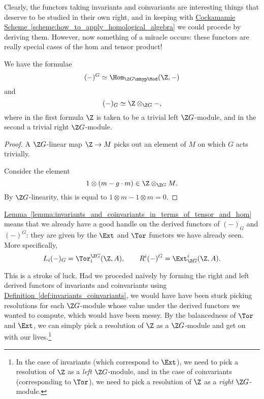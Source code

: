 \documentclass[main.tex]{subfiles}
\begin{document}
Clearly, the functors taking invariants and coinvariants are interesting things that deserve to be studied in their own right, and in keeping with \hyperref[scheme:how_to_apply_homological_algebra]{Cockamamie Scheme~\ref*{scheme:how_to_apply_homological_algebra}} we could procede by deriving them. However, now something of a miracle occurs: these functors are really special cases of the hom and tensor product!

\begin{lemma}
  \label{lemma:invariants_and_coinvariants_in_terms_of_tensor_and_hom}
  We have the formulae
  \begin{equation*}
    (-)^{G} \simeq \Hom_{\Z G\mhyp\Mod}(\Z, -)
  \end{equation*}
  and
  \begin{equation*}
    (-)_{G} \simeq \Z \otimes_{\Z G} -,
  \end{equation*}
  where in the first formula $\Z$ is taken to be a trivial left $\Z G$-module, and in the second a trivial right $\Z G$-module.
\end{lemma}
\begin{proof}
  A $\Z G$-linear map $\Z \to M$ picks out an element of $M$ on which $G$ acts trivially.

  Consider the element
  \begin{equation*}
    1 \otimes(m - g\cdot m) \in \Z \otimes_{\Z G} M.
  \end{equation*}
  By $\Z G$-linearity, this is equal to $1 \otimes m - 1 \otimes m = 0$.
\end{proof}

\hyperref[lemma:invariants_and_coinvariants_in_terms_of_tensor_and_hom]{Lemma~\ref*{lemma:invariants_and_coinvariants_in_terms_of_tensor_and_hom}} means that we already have a good handle on the derived functors of $(-)_{G}$ and $(-)^{G}$: they are given by the $\Ext$ and $\Tor$ functors we have already seen. More specifically,
\begin{equation*}
  L_{i}(-)_{G} = \Tor^{\Z G}_{i}(\Z, A),\qquad R^{i}(-)^{G} = \Ext_{\Z G}^{i}(\Z, A).
\end{equation*}

This is a stroke of luck. Had we proceded naïvely by forming the right and left derived functors of invariants and coinvariants using \hyperref[def:invariants_coinvariants]{Definition~\ref*{def:invariants_coinvariants}}, we would have have been stuck picking resolutions for each $\Z G$-module whose value under the derived functors we wanted to compute, which would have been messy. By the balancedness of $\Tor$ and $\Ext$, we can simply pick a resolution of $\Z$ as a $\Z G$-module and get on with our lives.\footnote{In the case of invariants (which correspond to $\Ext$), we need to pick a resolution of $\Z$ as a \emph{left} $\Z G$-module, and in the case of coinvariants (corresponding to $\Tor$), we need to pick a resolution of $\Z$ as a \emph{right} $\Z G$-module.}
\end{document}
